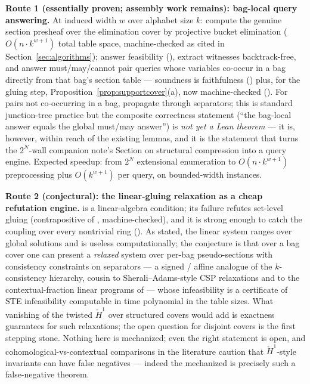 \documentclass[11pt]{article}
\newcommand{\Hech}{\check H}
\begin{document}
\textbf{Route 1 (essentially proven; assembly work remains): bag-local
query answering.}  At induced width $w$ over alphabet size $k$:
compute the genuine section presheaf over the elimination cover by
projective bucket elimination ($O(n \cdot k^{w+1})$ total table
space, machine-checked as cited in Section~\ref{sec:algorithms});
answer feasibility (),
extract witnesses backtrack-free, and answer must/may/cannot pair
queries whose variables co-occur in a bag directly from that bag's
section table --- soundness is faithfulness
() plus, for the gluing step,
Proposition~\ref{prop:supportcover}(a), now machine-checked
().  For pairs not
co-occurring in a bag, propagate through separators; this is standard
junction-tree practice \citep{dechter2003constraint} but the
composite correctness statement (``the bag-local answer equals the
global must/may answer'') is \emph{not yet a Lean theorem} --- it is,
however, within reach of the existing lemmas, and it is the statement
that turns the $2^N$-wall companion note's Section on structural
compression into a query engine.  Expected speedup: from $2^N$
extensional enumeration to $O(n \cdot k^{w+1})$ preprocessing plus
$O(k^{w+1})$ per query, on bounded-width instances.

\textbf{Route 2 (conjectural): the linear-gluing relaxation as a
cheap refutation engine.}   is a linear-algebra
condition; its failure refutes set-level gluing
(contrapositive of , machine-checked),
and it is strong enough to catch the coupling over every nontrivial
ring ().  As stated, the linear
system ranges over global solutions and is useless
computationally; the conjecture is that over a bag cover one can
present a \emph{relaxed} system over per-bag pseudo-sections with
consistency constraints on separators --- a signed / affine analogue
of the $k$-consistency hierarchy, cousin to Sherali--Adams-style CSP
relaxations and to the contextual-fraction linear programs of
\citet{abramsky2017contextualfraction} --- whose infeasibility is a
certificate of STE infeasibility computable in time polynomial in the
table sizes.  What vanishing of the twisted $\Hech^1$ over structured
covers would add is exactness guarantees for such relaxations; the
open  question for disjoint covers is the
first stepping stone.  Nothing here is mechanized; even the right
statement is open, and cohomological-vs-contextual comparisons in the
literature \citep{caru2017cohomology,okay2017topological,
aasnaess2022comparing} caution that $\Hech^1$-style invariants can
have false negatives --- indeed the mechanized
 is precisely such a false-negative
theorem.
\end{document}
